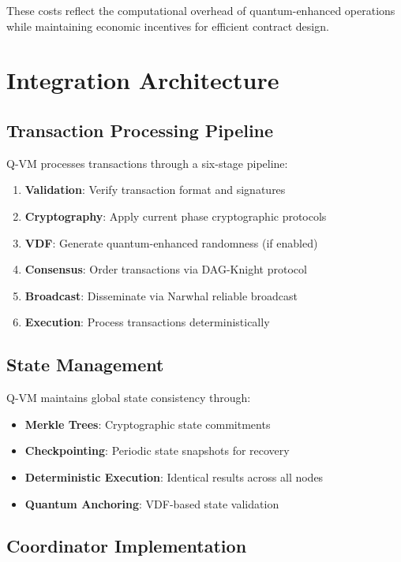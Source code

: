 \documentclass[11pt]{article}
\begin{document}
These costs reflect the computational overhead of quantum-enhanced operations while maintaining economic incentives for efficient contract design.

\section{Integration Architecture}

\subsection{Transaction Processing Pipeline}

Q-VM processes transactions through a six-stage pipeline:

\begin{enumerate}
    \item \textbf{Validation}: Verify transaction format and signatures
    \item \textbf{Cryptography}: Apply current phase cryptographic protocols
    \item \textbf{VDF}: Generate quantum-enhanced randomness (if enabled)
    \item \textbf{Consensus}: Order transactions via DAG-Knight protocol
    \item \textbf{Broadcast}: Disseminate via Narwhal reliable broadcast
    \item \textbf{Execution}: Process transactions deterministically
\end{enumerate}

\subsection{State Management}

Q-VM maintains global state consistency through:

\begin{itemize}
    \item \textbf{Merkle Trees}: Cryptographic state commitments
    \item \textbf{Checkpointing}: Periodic state snapshots for recovery
    \item \textbf{Deterministic Execution}: Identical results across all nodes
    \item \textbf{Quantum Anchoring}: VDF-based state validation
\end{itemize}

\subsection{Coordinator Implementation}
\end{document}

